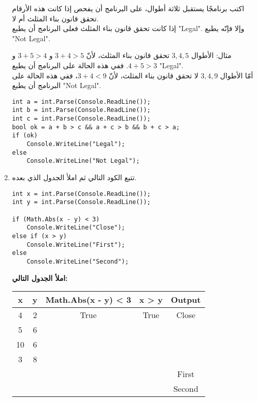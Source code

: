 ﻿\documentclass[12pt]{article}
\begin{document}
\begin{enumerate}[itemsep=2em]
اكتب برنامجًا يستقبل ثلاثة أطوال، على البرنامج أن يفحص إذا كانت هذه الأرقام تحقق قانون بناء المثلث أم لا. \\
إذا كانت تحقق قانون بناء المثلث فعلى البرنامج أن يطبع \textenglish{"Legal"}.
وإلا فإنّه يطبع \textenglish{"Not Legal"}.

مثال: الأطوال $3, 4, 5$ تحقق قانون بناء المثلث، لأنّ $3 + 4 > 5$ و $3 + 5 > 4$ و $4 + 5 > 3$. ففي هذه الحالة على البرنامج أن يطبع \textenglish{"Legal"}. \\
أمّا الأطوال $3, 4, 9$ لا تحقق قانون بناء المثلث، لأنّ $3 + 4 < 9$، ففي هذه الحالة على البرنامج أن يطبع \textenglish{"Not Legal"}.


\ifwithsols
\begin{boxSolution}
\begin{english}
\begin{verbatim}
int a = int.Parse(Console.ReadLine());
int b = int.Parse(Console.ReadLine());
int c = int.Parse(Console.ReadLine());
bool ok = a + b > c && a + c > b && b + c > a;
if (ok)
    Console.WriteLine("Legal");
else
    Console.WriteLine("Not Legal");
\end{verbatim}
\end{english}
\end{boxSolution}
\fi

\clearpage
\item
تتبع الكود التالي ثم املأ الجدول الذي بعده.

\begin{boxCode}
\begin{english}
\begin{verbatim}
int x = int.Parse(Console.ReadLine());
int y = int.Parse(Console.ReadLine());

if (Math.Abs(x - y) < 3)
    Console.WriteLine("Close");
else if (x > y)
    Console.WriteLine("First");
else
    Console.WriteLine("Second");
\end{verbatim}
\end{english}
\end{boxCode}

\textbf{املأ الجدول التالي:}
\begin{center}
\begin{tabular}{|c|c|c|c|c|}
\hline
\textbf{x} & \textbf{y} & \textenglish{Math.Abs(x - y) < 3} & \textenglish{x > y} & \textbf{Output} \\
\hline
4 & 2 & True & True & Close \\
\hline
5 & 6 &  &  &  \\
\hline
10 & 6 &  &  &  \\
\hline
3 & 8 &  &  &  \\
\hline
 &  &  &  & First \\
\hline
 &  &  &  & Second \\
\hline
\end{tabular}
\end{center}


\end{enumerate}
\end{document}
